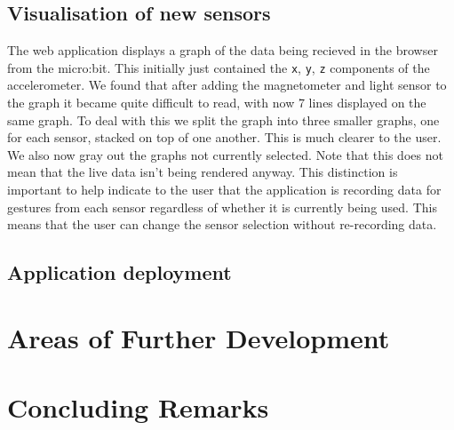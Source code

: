 \documentclass{article}
\begin{document}
\subsection{Visualisation of new sensors}%
\label{subsec:sensorvis}
The web application displays a graph of the data being recieved in the browser from the micro:bit. This initially just contained the \verb|x|, \verb|y|, \verb|z| components of the accelerometer. We found that after adding the magnetometer and light sensor to the graph it became quite difficult to read, with now 7 lines displayed on the same graph. To deal with this we split the graph into three smaller graphs, one for each sensor, stacked on top of one another. This is much clearer to the user. We also now gray out the graphs not currently selected. Note that this does not mean that the live data isn't being rendered anyway. This distinction is important to help indicate to the user that the application is recording data for gestures from each sensor regardless of whether it is currently being used. This means that the user can change the sensor selection without re-recording data.

\subsection{Application deployment}%
\label{subsec:deployment}

\section{Areas of Further Development}%
\label{sec:development}

\section{Concluding Remarks}%
\label{sec:conclusion}


\raggedright
\end{document}
